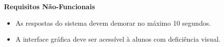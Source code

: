 \documentclass[12pt, a4paper]{article}
\newcommand{\tb}[1]{\textbf{#1}}
\begin{document}
\begin{enumerate}[label=\textbf{\arabic*.}]
{{{                     \tb{Requisitos Não-Funcionais}
                     \begin{itemize}
                         \item As respostas do sistema devem demorar no máximo 10 segundos.
                         \item A interface gráfica deve ser acessível à alunos com deficiência visual.
                     \end{itemize}
             }}
        }
        
    \end{enumerate}



    
\end{document}
